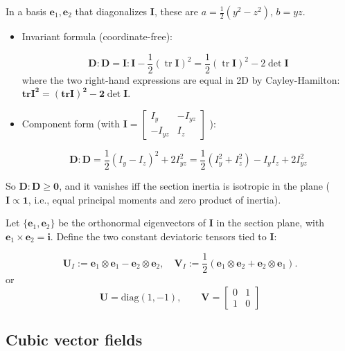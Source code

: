 In a basis \({\mathbf{e}_1,\mathbf{e}_2}\) that diagonalizes
\(\mathbf{I}\), these are $a=\tfrac12(y^2-z^2)$, $b=yz$. 



\begin{itemize}
    \item 
Invariant formula (coordinate-free):

$$
\mathbf{D}: \mathbf{D}=\mathbf{I}: \mathbf{I}-\frac{1}{2}(\operatorname{tr} \mathbf{I})^2=\frac{1}{2}(\operatorname{tr} \mathbf{I})^2-2 \operatorname{det} \mathbf{I}
$$
where the two right-hand expressions are equal in 2D by Cayley-Hamilton: $\mathbf{t r I}^{\mathbf{2}}=(\mathbf{t r I})^{\mathbf{2}}-\mathbf{2} \operatorname{det} \mathbf{I}$.
\item Component form (with $\mathbf{I}=\left[\begin{array}{cc}I_y & -I_{y z} \\ -I_{y z} & I_z\end{array}\right]$ ):

$$
\mathbf{D}: \mathbf{D}=\frac{1}{2}\left(I_y-I_z\right)^2+2 I_{y z}^2=\frac{1}{2}\left(I_y^2+I_z^2\right)-I_y I_z+2 I_{y z}^2
$$

\end{itemize}

So $\mathbf{D}: \mathbf{D} \geq \mathbf{0}$, and it vanishes iff the section inertia is isotropic in the plane ( $\mathbf{I} \propto \mathbf{1}$, i.e., equal principal moments and zero product of inertia).

Let $\{\mathbf{e}_{1}, \mathbf{e}_{2}\}$ be the orthonormal eigenvectors of $\mathbf{I}$ in the section plane, with $\mathbf{e}_{1} \times \mathbf{e}_{2}=\mathbf{i}$. 
Define the two constant deviatoric tensors tied to $\mathbf{I}$:

$$
\mathbf{U}_I:=\mathbf{e}_{1} \otimes \mathbf{e}_{1}-\mathbf{e}_{2} \otimes \mathbf{e}_{2}, 
\quad
\mathbf{V}_I:=\frac{1}{2}(\mathbf{e}_{1} \otimes \mathbf{e}_{2}+\mathbf{e}_{2} \otimes \mathbf{e}_{1}) .
$$
or
\[
\mathbf{U}=\mathrm{diag}(1,-1),\qquad
\mathbf{V}=\begin{bmatrix}
0&1\\
1&0
\end{bmatrix}
\]



\subsection{Cubic vector fields}\label{cubic-vector-fields}

